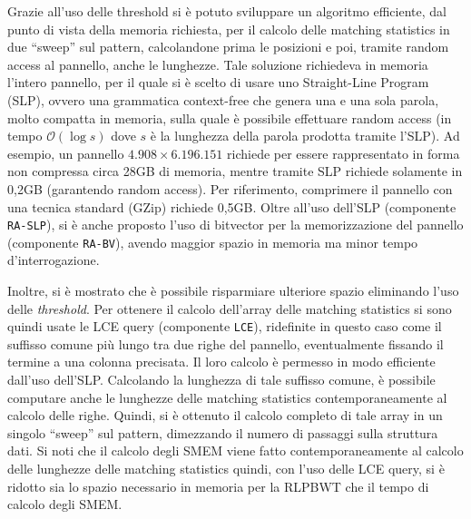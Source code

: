 \documentclass[a4paper,11pt, oneside,italian]{article}
\begin{document}
Grazie all'uso delle threshold si è potuto sviluppare un algoritmo
efficiente, dal punto di vista della memoria richiesta, per il calcolo delle
matching statistics in due ``sweep'' sul pattern, calcolandone prima le
posizioni e poi, tramite random access al pannello, anche le
lunghezze. Tale soluzione richiedeva in memoria l'intero pannello, per il quale
si è scelto di usare uno Straight-Line Program (SLP), ovvero una grammatica
context-free che genera una e una sola parola, molto compatta in memoria, sulla
quale è possibile effettuare random access (in tempo $\mathcal{O}(\log s)$ dove
$s$ è la lunghezza della parola prodotta tramite l'SLP).
Ad esempio, un pannello  $4.908 \times 6.196.151$ richiede per essere
rappresentato in forma non compressa circa 28GB di memoria, mentre tramite SLP
richiede 
solamente in 0,2GB (garantendo random access). Per riferimento, comprimere il
pannello con una tecnica 
standard (GZip) richiede 0,5GB. Oltre all'uso dell'SLP (componente
\texttt{RA-SLP}), si è anche proposto l'uso di bitvector per la memorizzazione
del pannello (componente \texttt{RA-BV}), avendo maggior spazio in memoria ma
minor tempo d'interrogazione. 

Inoltre, si è mostrato che è possibile risparmiare ulteriore spazio eliminando
l'uso delle \textit{threshold}. Per ottenere il calcolo dell'array delle
matching statistics si sono quindi usate le LCE query (componente \texttt{LCE}),
ridefinite in questo caso 
come il suffisso comune più lungo tra due righe del pannello, eventualmente
fissando il termine a una colonna precisata. Il loro calcolo è permesso
in modo efficiente dall'uso dell'SLP. Calcolando la
lunghezza di tale suffisso comune, è possibile computare anche le
lunghezze delle matching statistics contemporaneamente al calcolo delle
righe. Quindi, si è ottenuto il calcolo completo di tale array in
un singolo ``sweep'' sul pattern, dimezzando il numero di passaggi sulla
struttura dati. Si noti che il calcolo degli SMEM viene fatto
contemporaneamente al calcolo delle lunghezze delle matching statistics quindi,
con l'uso delle LCE query, si è ridotto sia lo spazio necessario in memoria per
la RLPBWT che il tempo di calcolo degli SMEM.
\end{document}

